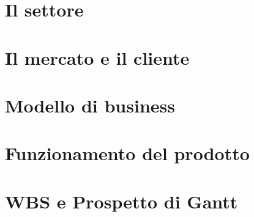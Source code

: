 \documentclass[a4paper, 12pt]{article}
\begin{document}
	\section{Il settore}
	\section{Il mercato e il cliente}
	\section{Modello di business}
	\section{Funzionamento del prodotto}
	\section{WBS e Prospetto di Gantt}
\end{document}
